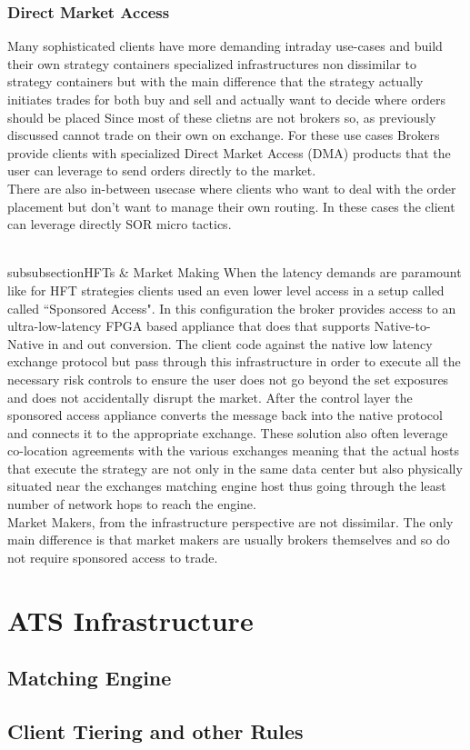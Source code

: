 \subsubsection{Direct Market Access}
Many sophisticated clients have more demanding intraday use-cases and build their own strategy containers specialized infrastructures non dissimilar to strategy containers but with the main difference that the strategy actually initiates trades for both buy and sell and actually want to decide where orders should be placed Since most of these clietns are not brokers so, as previously discussed cannot trade on their own on exchange. For these use cases Brokers provide clients with specialized Direct Market Access (DMA) products that the user can leverage to send orders directly to the market. \\

There are also in-between usecase where clients who want to deal with the order placement but don't want to manage their own routing. In these cases the client can leverage directly SOR micro tactics.

\\subsubsection{HFTs & Market Making}
When the latency demands are paramount like for HFT strategies clients used an even lower level access in a setup  called called ``Sponsored Access". In this configuration the broker provides access to an ultra-low-latency FPGA based appliance that does that supports Native-to-Native in and out conversion. The client code against the native low latency exchange protocol but pass through this infrastructure in order to execute all the necessary risk controls to ensure the user  does not go beyond the set exposures and does not accidentally disrupt the market. After the control layer the sponsored access appliance converts the message back into the native protocol and connects it to the appropriate exchange. These solution also often leverage co-location agreements with the various exchanges meaning that the actual hosts that execute the strategy are not only in the same data center but also physically situated near the exchanges matching engine host thus going through the least number of network hops to reach the engine.\\

Market Makers, from the infrastructure perspective are not dissimilar. The only main difference is that market makers are usually brokers themselves and so do not require sponsored access to trade.

\section{ATS Infrastructure}
\subsection{Matching Engine}
\subsection{Client Tiering and other Rules}

